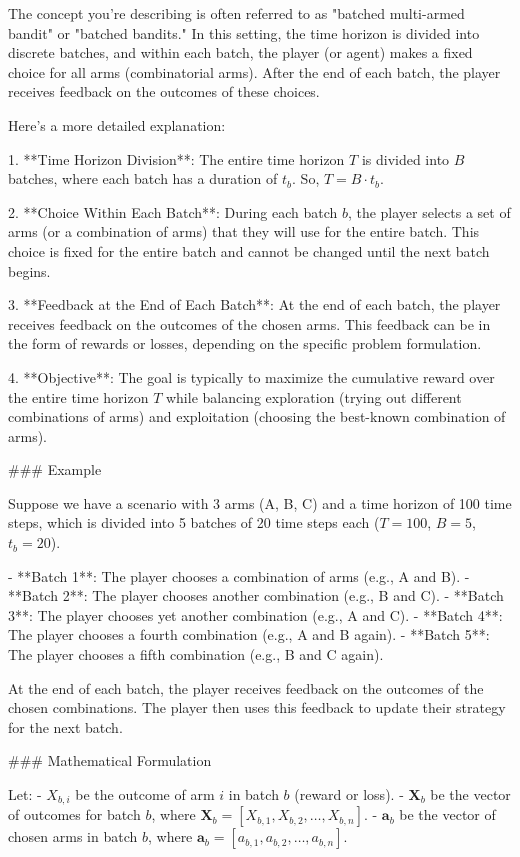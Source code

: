 The concept you're describing is often referred to as "batched multi-armed bandit" or "batched bandits." In this setting, the time horizon is divided into discrete batches, and within each batch, the player (or agent) makes a fixed choice for all arms (combinatorial arms). After the end of each batch, the player receives feedback on the outcomes of these choices.

Here's a more detailed explanation:

1. **Time Horizon Division**: The entire time horizon \( T \) is divided into \( B \) batches, where each batch has a duration of \( t_b \). So, \( T = B \cdot t_b \).

2. **Choice Within Each Batch**: During each batch \( b \), the player selects a set of arms (or a combination of arms) that they will use for the entire batch. This choice is fixed for the entire batch and cannot be changed until the next batch begins.

3. **Feedback at the End of Each Batch**: At the end of each batch, the player receives feedback on the outcomes of the chosen arms. This feedback can be in the form of rewards or losses, depending on the specific problem formulation.

4. **Objective**: The goal is typically to maximize the cumulative reward over the entire time horizon \( T \) while balancing exploration (trying out different combinations of arms) and exploitation (choosing the best-known combination of arms).

### Example

Suppose we have a scenario with 3 arms (A, B, C) and a time horizon of 100 time steps, which is divided into 5 batches of 20 time steps each (\( T = 100 \), \( B = 5 \), \( t_b = 20 \)).

- **Batch 1**: The player chooses a combination of arms (e.g., A and B).
- **Batch 2**: The player chooses another combination (e.g., B and C).
- **Batch 3**: The player chooses yet another combination (e.g., A and C).
- **Batch 4**: The player chooses a fourth combination (e.g., A and B again).
- **Batch 5**: The player chooses a fifth combination (e.g., B and C again).

At the end of each batch, the player receives feedback on the outcomes of the chosen combinations. The player then uses this feedback to update their strategy for the next batch.

### Mathematical Formulation

Let:
- \( X_{b,i} \) be the outcome of arm \( i \) in batch \( b \) (reward or loss).
- \( \mathbf{X}_b \) be the vector of outcomes for batch \( b \), where \( \mathbf{X}_b = [X_{b,1}, X_{b,2}, \ldots, X_{b,n}] \).
- \( \mathbf{a}_b \) be the vector of chosen arms in batch \( b \), where \( \mathbf{a}_b = [a_{b,1}, a_{b,2}, \ldots, a_{b,n}] \).

